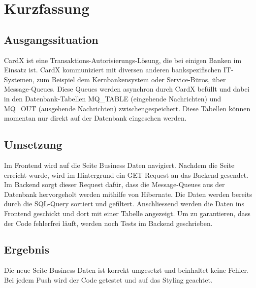 \chapter{Kurzfassung}\label{ch:kurzfassung}

\section{Ausgangssituation} 
\gls{CardX} ist eine Transaktions-Autorisierungs-Lösung, die bei einigen Banken im Einsatz ist. CardX kommuniziert mit diversen anderen bankspezifischen IT-Systemen, zum Beispiel dem Kernbankensystem oder Service-Büros, über Message-Queues. Diese Queues werden asynchron durch CardX befüllt und dabei in den Datenbank-Tabellen MQ\_TABLE (eingehende Nachrichten) und MQ\_OUT (ausgehende Nachrichten) zwischengespeichert. Diese Tabellen können momentan nur direkt auf der Datenbank eingesehen werden.

\section{Umsetzung} 
Im Frontend wird auf die Seite Business Daten navigiert. Nachdem die Seite erreicht wurde, wird im Hintergrund ein GET-Request an das Backend gesendet. Im Backend sorgt dieser Request dafür, dass die Message-Queues aus der Datenbank hervorgeholt werden mithilfe von Hibernate. Die Daten werden bereits durch die SQL-Query sortiert und gefiltert. Anschliessend werden die Daten ins Frontend geschickt und dort mit einer Tabelle angezeigt. Um zu garantieren, dass der Code fehlerfrei läuft, werden noch Tests im Backend geschrieben.

\section{Ergebnis}
Die neue Seite Business Daten ist korrekt umgesetzt und beinhaltet keine Fehler. Bei jedem Push wird der Code getestet und auf das Styling geachtet. 

\newpage